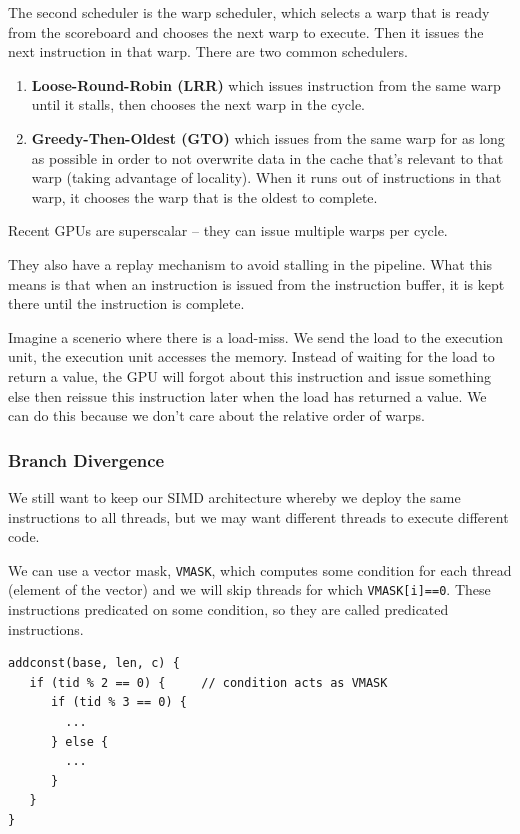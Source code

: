 \documentclass{article}
\begin{document}
The second scheduler is the warp scheduler, which selects a warp that is ready from the scoreboard and chooses the next warp to execute. Then it issues the next instruction in that warp.  There are two common schedulers. 

\begin{enumerate}
\item \textbf{Loose-Round-Robin (LRR)} which issues instruction from the same warp until it stalls, then chooses the next warp in the cycle. \item \textbf{Greedy-Then-Oldest (GTO)} which issues from the same warp for as long as possible in order to not overwrite data in the cache that's relevant to that warp (taking advantage of locality). When it runs out of instructions in that warp, it chooses the warp that is the oldest to complete. 

\end{enumerate}

Recent GPUs are superscalar -- they can issue multiple warps per cycle. 

They also  have a replay mechanism to avoid stalling in the pipeline. What this means is that when an instruction is issued from the instruction buffer, it is kept there until the instruction is complete. 

Imagine a scenerio where there is a load-miss. We send the load to the execution unit, the execution unit accesses the memory. Instead of waiting for the load to return a value, the GPU will forgot about this instruction and issue something else then reissue this instruction later when the load has returned a value. We can do this because we don't care about the relative order of warps. 

\subsubsection{Branch Divergence}

We still want to keep our SIMD architecture whereby we deploy the same instructions to all threads, but we may want different threads to execute different code.

We can use a vector mask, \texttt{VMASK}, which computes some condition for each thread (element of the vector) and we will skip threads for which \texttt{VMASK[i]==0}.  These instructions predicated on some condition, so they are called predicated instructions.

\scriptsize
\begin{verbatim}
addconst(base, len, c) {
   if (tid % 2 == 0) {     // condition acts as VMASK
      if (tid % 3 == 0) {
        ...
      } else {
        ...
      }
   }
}
\end{verbatim}
\normalsize
\end{document}
